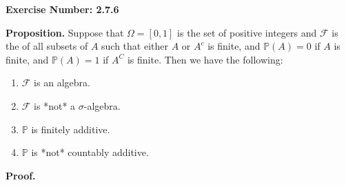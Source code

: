\documentclass{article}
\begin{document}
\noindent \textbf{Exercise Number: 2.7.6}  %

\medskip 

\noindent \textbf{Proposition.} Suppose that $\Omega = [0,1]$ is the set of positive integers 
and $\mathcal{F}$ is the of all subsets of $A$ such that either $A$ or $A^c$ is finite, and 
$\mathbb{P}(A) = 0$ if $A$ is finite, and $\mathbb{P}(A) = 1$ if $A^C$ is finite. Then we have
the following:

\begin{enumerate}

\item $\mathcal{F}$ is an algebra. 

\item $\mathcal{F}$ is *not* a $\sigma$-algebra.

\item $\mathbb{P}$ is finitely additive. 

\item $\mathbb{P}$ is *not* countably additive. 

\end{enumerate}

\bigskip

\noindent \textbf{Proof.}  

\medskip
\end{document}
